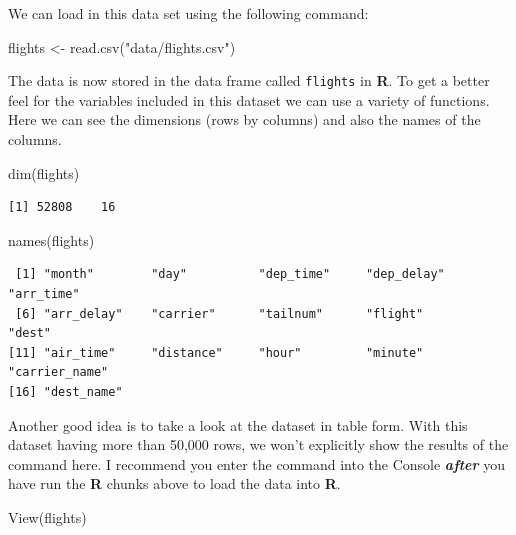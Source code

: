 \documentclass[
  letterpaper,
  12pt,
  twoside]{book}
\newenvironment{Shaded}{\begin{snugshade}}{\end{snugshade}}
\newcommand{\FunctionTok}[1]{\textcolor[rgb]{0.28,0.35,0.67}{#1}}
\newcommand{\NormalTok}[1]{\textcolor[rgb]{0.00,0.23,0.31}{#1}}
\newcommand{\OtherTok}[1]{\textcolor[rgb]{0.00,0.23,0.31}{#1}}
\newcommand{\StringTok}[1]{\textcolor[rgb]{0.13,0.47,0.30}{#1}}
\begin{document}
We can load in this data set using the following command:

\begin{Shaded}
\begin{Highlighting}[]
\NormalTok{flights }\OtherTok{\textless{}{-}} \FunctionTok{read.csv}\NormalTok{(}\StringTok{"data/flights.csv"}\NormalTok{)}
\end{Highlighting}
\end{Shaded}

The data is now stored in the data frame called \texttt{flights} in
\textbf{R}. To get a better feel for the variables included in this
dataset we can use a variety of functions. Here we can see the
dimensions (rows by columns) and also the names of the columns.

\begin{Shaded}
\begin{Highlighting}[]
\FunctionTok{dim}\NormalTok{(flights)}
\end{Highlighting}
\end{Shaded}

\begin{verbatim}
[1] 52808    16
\end{verbatim}

\begin{Shaded}
\begin{Highlighting}[]
\FunctionTok{names}\NormalTok{(flights)}
\end{Highlighting}
\end{Shaded}

\begin{verbatim}
 [1] "month"        "day"          "dep_time"     "dep_delay"    "arr_time"    
 [6] "arr_delay"    "carrier"      "tailnum"      "flight"       "dest"        
[11] "air_time"     "distance"     "hour"         "minute"       "carrier_name"
[16] "dest_name"   
\end{verbatim}

Another good idea is to take a look at the dataset in table form. With
this dataset having more than 50,000 rows, we won't explicitly show the
results of the command here. I recommend you enter the command into the
Console \textbf{\emph{after}} you have run the \textbf{R} chunks above
to load the data into \textbf{R}.

\begin{Shaded}
\begin{Highlighting}[]
\FunctionTok{View}\NormalTok{(flights)}
\end{Highlighting}
\end{Shaded}
\end{document}
